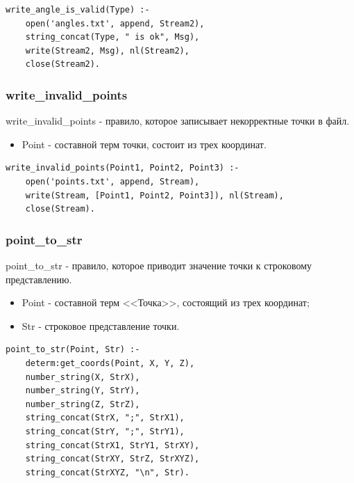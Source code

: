 \begin{lstlisting}[caption=Реализация правила write\_angle\_is\_valid, label=rules:writeangleisvalid]
write_angle_is_valid(Type) :- 
	open('angles.txt', append, Stream2),
	string_concat(Type, " is ok", Msg),
	write(Stream2, Msg), nl(Stream2),
	close(Stream2).
\end{lstlisting}

\subsubsection{write\_invalid\_points}
\hspace{0.6cm} write\_invalid\_points - правило, которое записывает некорректные точки в файл.

\begin{itemize}
	\item Point - составной терм точки, состоит из трех координат.
\end{itemize}

\begin{lstlisting}[caption=Реализация правила write\_invalid\_points, label=rules:writeinvalidpoints]
write_invalid_points(Point1, Point2, Point3) :-
	open('points.txt', append, Stream),
	write(Stream, [Point1, Point2, Point3]), nl(Stream),
	close(Stream).
\end{lstlisting}

\subsubsection{point\_to\_str}
\hspace{0.6cm} point\_to\_str - правило, которое приводит значение точки к строковому представлению.

\begin{itemize}
	\item Point - составной терм <<Точка>>, состоящий из трех координат;
	\item Str - строковое представление точки.
\end{itemize}

\begin{lstlisting}[caption=Реализация правила point\_to\_str, label=rules:pointtostr]
point_to_str(Point, Str) :-
	determ:get_coords(Point, X, Y, Z),
	number_string(X, StrX),
	number_string(Y, StrY),
	number_string(Z, StrZ),
	string_concat(StrX, ";", StrX1),
	string_concat(StrY, ";", StrY1),
	string_concat(StrX1, StrY1, StrXY),
	string_concat(StrXY, StrZ, StrXYZ),
	string_concat(StrXYZ, "\n", Str).
\end{lstlisting}

